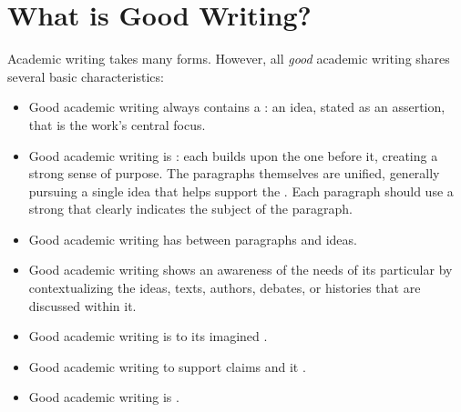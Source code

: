 
\hypertarget{good-writing}{}

\chapter{What is Good Writing?}


Academic writing takes many forms. However, all \emph{good} academic writing shares several basic characteristics:

\begin{itemize}

\item Good academic writing always contains a : an idea, stated as an assertion, that is the work's central focus.
\item Good academic writing is : each \hyperlink{organization}{\color{Ahrenge}{paragraph}} builds upon the one before it, creating a strong sense of purpose. The paragraphs themselves are unified, generally pursuing a single idea that helps support the . Each paragraph should use a strong \hyperlink{organization}{\color{Ahrenge}{topic sentence}} that clearly indicates the subject of the paragraph.
\item Good academic writing has  between paragraphs and ideas.
\item Good academic writing shows an awareness of the needs of its particular \hyperlink{audience}{\color{Ahrenge}{audience}} by contextualizing the ideas, texts, authors, debates, or histories that are discussed within it.
\item Good academic writing is  to its imagined \hyperlink{audience}{\color{Ahrenge}{audience}}.
\item Good academic writing  to support claims and it \hyperlink{sources}{\color{Ahrenge}{properly credits outside sources with citations}}.
\item Good academic writing is .

\end{itemize}


